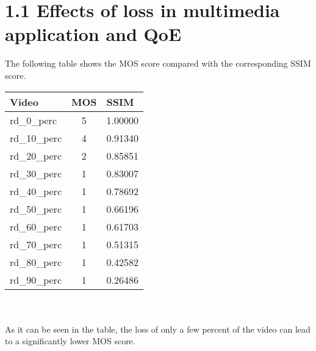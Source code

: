 \documentclass{article}
\begin{document}
	\pagestyle{fancy}
	\hfill
	
	\section*{1.1 Effects of loss in multimedia application and QoE}
	\begin{adjustwidth}{2em}{2em}
		The following table shows the MOS score compared with the corresponding SSIM score. \\
		\begin{center}
			\begin{tabular}{|l|c|l|}
				\hline
				Video & MOS & SSIM \\
				\hline
				rd\_0\_perc & 5 & 1.00000 \\
				rd\_10\_perc & 4 & 0.91340 \\
				rd\_20\_perc & 2 & 0.85851 \\
				rd\_30\_perc & 1 & 0.83007 \\
				rd\_40\_perc & 1 & 0.78692 \\
				rd\_50\_perc & 1 & 0.66196 \\
				rd\_60\_perc & 1 & 0.61703 \\
				rd\_70\_perc & 1 & 0.51315 \\
				rd\_80\_perc & 1 & 0.42582 \\
				rd\_90\_perc & 1 & 0.26486 \\
				\hline
			\end{tabular}
		\end{center}
		\hfill \\ \\		
		As it can be seen in the table, the loss of only a few percent of the video can lead to a significantly lower MOS score. 
	\end{adjustwidth}
\end{document}
